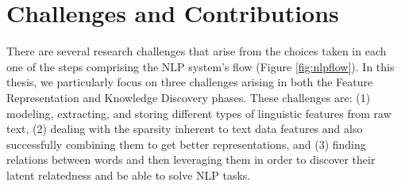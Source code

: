 \section{Challenges and Contributions}
There are several research challenges that arise from the choices taken in each one of the steps comprising the NLP system's flow (Figure \ref{fig:nlpflow}).
 In this thesis, we particularly focus on three challenges arising in both the Feature Representation and Knowledge Discovery phases. These challenges are: (1) modeling, extracting, and storing different types of linguistic features from raw text, (2) dealing with the sparsity inherent to text data features and also successfully combining them to get better representations, and (3)  finding	 relations  between words and then leveraging them in order to discover their latent relatedness and be able to solve NLP tasks.

%	


